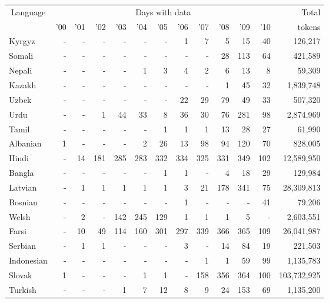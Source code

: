 \documentclass{article}
\begin{document}
\begin{table}[h!]
\setlength{\tabcolsep}{1ex}
\footnotesize
\begin{center}
\begin{tabular}{l|rrrrrrrrrrr|r}
\multicolumn{1}{c}{Language}		&	\multicolumn{11}{c}{Days with data}	&	Total\\
\cline{2-12}
	&	'00	&	'01	&	'02		&	'03	&	'04		&	'05		&	'06	&	'07	&	'08	&	'09	&	'10	&	tokens\\
\hline
Kyrgyz	&	-	&	-	&	-	&	-	&	-	&	-	&	1	&	7	&	5	&	15	&	40	&	126,217\\
Somali	&	-	&	-	&	-	&	-	&	-	&	-	&	-	&	-	&	28	&	113	&	64	&	421,589\\
Nepali	&	-	&	-	&	-	&	-	&	1	&	3	&	4	&	2	&	6	&	13	&	8	&	59,309\\
Kazakh	&	-	&	-	&	-	&	-	&	-	&	-	&	-	&	-	&	1	&	45	&	32	&	1,839,748\\
Uzbek	&	-	&	-	&	-	&	-	&	-	&	-	&	22	&	29	&	79	&	49	&	33	&	507,320\\
Urdu	&	-	&	-	&	1	&	44	&	33	&	8	&	36	&	30	&	76	&	281	&	98	&	2,874,969\\
Tamil	&	-	&	-	&	-	&	-	&	-	&	1	&	1	&	1	&	13	&	28	&	27	&	61,990\\
Albanian	&	1	&	-	&	-	&	-	&	2	&	26	&	13	&	98	&	94	&	120	&	70	&	828,005\\
Hindi	&	-	&	14	&	181	&	285	&	283	&	332	&	334	&	325	&	331	&	349	&	102	&	12,589,950\\
Bangla	&	-	&	-	&	-	&	-	&	-	&	1	&	1	&	-	&	4	&	18	&	29	&	129,984\\
Latvian	&	-	&	1	&	1	&	1	&	1	&	1	&	3	&	21	&	178	&	341	&	75	&	28,309,813\\
Bosnian	&	-	&	-	&	-	&	-	&	-	&	-	&	1	&	-	&	-	&	-	&	41	&	79,206\\
Welsh	&	-	&	2	&	-	&	142	&	245	&	129	&	1	&	1	&	1	&	5	&	-	&	2,603,551\\
Farsi	&	-	&	10	&	49	&	114	&	160	&	301	&	297	&	339	&	366	&	365	&	109	&	26,041,987\\
Serbian	&	-	&	1	&	1	&	-	&	-	&	-	&	3	&	-	&	14	&	84	&	19	&	221,503\\
Indonesian	&	-	&	-	&	-	&	-	&	-	&	-	&	-	&	1	&	1	&	59	&	99	&	1,135,783\\
Slovak	&	1	&	-	&	-	&	-	&	1	&	1	&	-	&	158	&	356	&	364	&	100	&	103,732,925\\
Turkish	&	-	&	-	&	-	&	1	&	7	&	12	&	8	&	9	&	24	&	153	&	69	&	1,135,200\\

\end{tabular}
\end{center}
\end{table}
\end{document}
